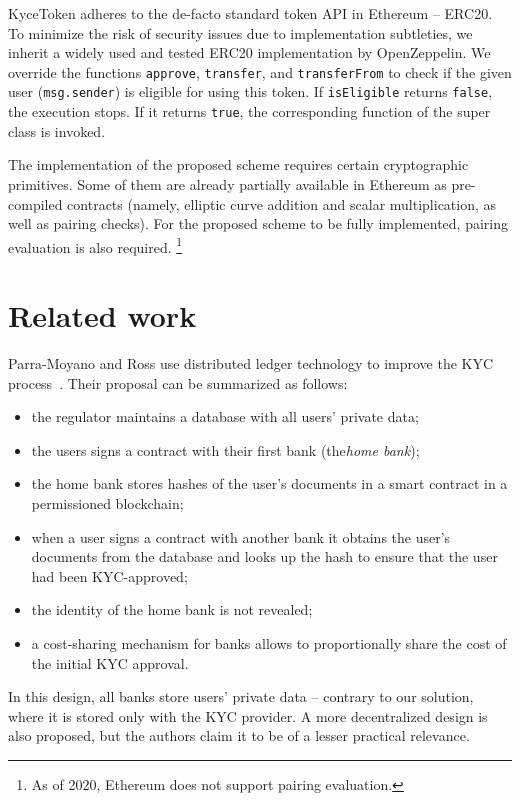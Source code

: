 KyceToken adheres to the de-facto standard token API in Ethereum -- ERC20.
To minimize the risk of security issues due to implementation subtleties, we inherit a widely used and tested ERC20 implementation by OpenZeppelin.
We override the functions \texttt{approve}, \texttt{transfer}, and \texttt{transferFrom} to check if the given user (\texttt{msg.sender}) is eligible for using this token.
If \texttt{isEligible} returns \texttt{false}, the execution stops.
If it returns \texttt{true}, the corresponding function of the super class is invoked.

The implementation of the proposed scheme requires certain cryptographic primitives.
Some of them are already partially available in Ethereum as pre-compiled contracts (namely, elliptic curve addition and scalar multiplication, as well as pairing checks).
For the proposed scheme to be fully implemented, pairing evaluation is also required.
\footnote{As of 2020, Ethereum does not support pairing evaluation.}



\section{Related work}

Parra-Moyano and Ross use distributed ledger technology to improve the KYC process~\cite{Moyano2017}.
Their proposal can be summarized as follows:
\begin{itemize}
	\item the regulator maintains a database with all users' private data;
	\item the users signs a contract with their first bank (the\textit{home bank});
	\item the home bank stores hashes of the user's documents in a smart contract in a permissioned blockchain;
	\item when a user signs a contract with another bank it obtains the user's documents from the database and looks up the hash to ensure that the user had been KYC-approved;
	\item the identity of the home bank is not revealed;
	\item a cost-sharing mechanism for banks allows to proportionally share the cost of the initial KYC approval.
\end{itemize}
In this design, all banks store users' private data -- contrary to our solution, where it is stored only with the KYC provider.
A more decentralized design is also proposed, but the authors claim it to be of a lesser practical relevance.

